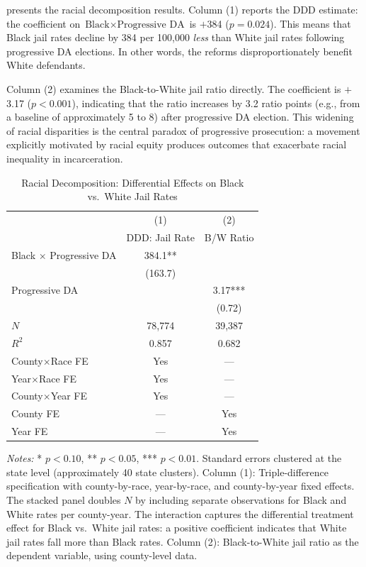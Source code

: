 \documentclass[12pt]{article}
\begin{document}
 presents the racial decomposition results. Column (1) reports the DDD estimate: the coefficient on $\text{Black} \times \text{Progressive DA}$ is $+$384 ($p = 0.024$). This means that Black jail rates decline by 384 per 100,000 \textit{less} than White jail rates following progressive DA elections. In other words, the reforms disproportionately benefit White defendants.

Column (2) examines the Black-to-White jail ratio directly. The coefficient is $+$3.17 ($p < 0.001$), indicating that the ratio increases by 3.2 ratio points (e.g., from a baseline of approximately 5 to 8) after progressive DA election. This widening of racial disparities is the central paradox of progressive prosecution: a movement explicitly motivated by racial equity produces outcomes that exacerbate racial inequality in incarceration.

\begin{table}[H]
\centering
\caption{Racial Decomposition: Differential Effects on Black vs.\ White Jail Rates}
\label{tab:ddd}
\begin{threeparttable}
\begin{tabular}{lcc}
\toprule
& (1) & (2) \\
& DDD: Jail Rate & B/W Ratio \\
\midrule
Black $\times$ Progressive DA & 384.1** & \\
& (163.7) & \\
Progressive DA & & 3.17*** \\
& & (0.72) \\
\midrule
$N$ & 78,774 & 39,387 \\
$R^2$ & 0.857 & 0.682 \\
County$\times$Race FE & Yes & --- \\
Year$\times$Race FE & Yes & --- \\
County$\times$Year FE & Yes & --- \\
County FE & --- & Yes \\
Year FE & --- & Yes \\
\bottomrule
\end{tabular}
\begin{tablenotes}[flushleft]
\small
\item \textit{Notes:} * $p<0.10$, ** $p<0.05$, *** $p<0.01$. Standard errors clustered at the state level (approximately 40 state clusters). Column (1): Triple-difference specification with county-by-race, year-by-race, and county-by-year fixed effects. The stacked panel doubles $N$ by including separate observations for Black and White rates per county-year. The interaction captures the differential treatment effect for Black vs.\ White jail rates: a positive coefficient indicates that White jail rates fall more than Black rates. Column (2): Black-to-White jail ratio as the dependent variable, using county-level data.
\end{tablenotes}
\end{threeparttable}
\end{table}
\end{document}
